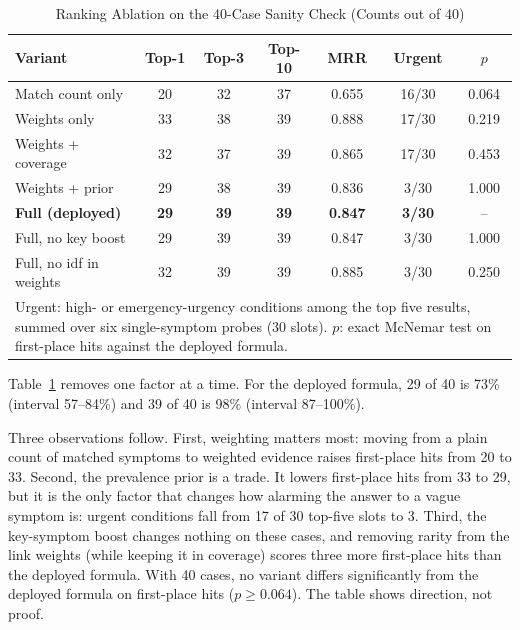 \documentclass[conference]{IEEEtran}
\begin{document}
\begin{table}[!t]
\caption{Ranking Ablation on the 40-Case Sanity Check (Counts out of 40)}
\label{tab:ablation}
\centering
\footnotesize
\setlength{\tabcolsep}{3pt}
\renewcommand{\arraystretch}{1.15}
\begin{tabular}{lcccccc}
\hline
\textbf{Variant} & \textbf{Top-1} & \textbf{Top-3} & \textbf{Top-10} & \textbf{MRR} & \textbf{Urgent} & \textbf{$p$} \\
\hline
Match count only & 20 & 32 & 37 & 0.655 & 16/30 & 0.064 \\
Weights only & 33 & 38 & 39 & 0.888 & 17/30 & 0.219 \\
Weights + coverage & 32 & 37 & 39 & 0.865 & 17/30 & 0.453 \\
Weights + prior & 29 & 38 & 39 & 0.836 & 3/30 & 1.000 \\
\textbf{Full (deployed)} & \textbf{29} & \textbf{39} & \textbf{39} & \textbf{0.847} & \textbf{3/30} & -- \\
Full, no key boost & 29 & 39 & 39 & 0.847 & 3/30 & 1.000 \\
Full, no idf in weights & 32 & 39 & 39 & 0.885 & 3/30 & 0.250 \\
\hline
\multicolumn{7}{p{3.3in}}{\rule{0pt}{2.4ex}Urgent: high- or emergency-urgency conditions among the top five results, summed over six single-symptom probes (30 slots). $p$: exact McNemar test on first-place hits against the deployed formula.}
\end{tabular}
\end{table}

Table~\ref{tab:ablation} removes one factor at a time. For the deployed formula, 29 of 40 is 73\% (interval 57--84\%) and 39 of 40 is 98\% (interval 87--100\%).

Three observations follow. First, weighting matters most: moving from a plain count of matched symptoms to weighted evidence raises first-place hits from 20 to 33. Second, the prevalence prior is a trade. It lowers first-place hits from 33 to 29, but it is the only factor that changes how alarming the answer to a vague symptom is: urgent conditions fall from 17 of 30 top-five slots to 3. Third, the key-symptom boost changes nothing on these cases, and removing rarity from the link weights (while keeping it in coverage) scores three more first-place hits than the deployed formula. With 40 cases, no variant differs significantly from the deployed formula on first-place hits ($p \geq 0.064$). The table shows direction, not proof.
\end{document}
